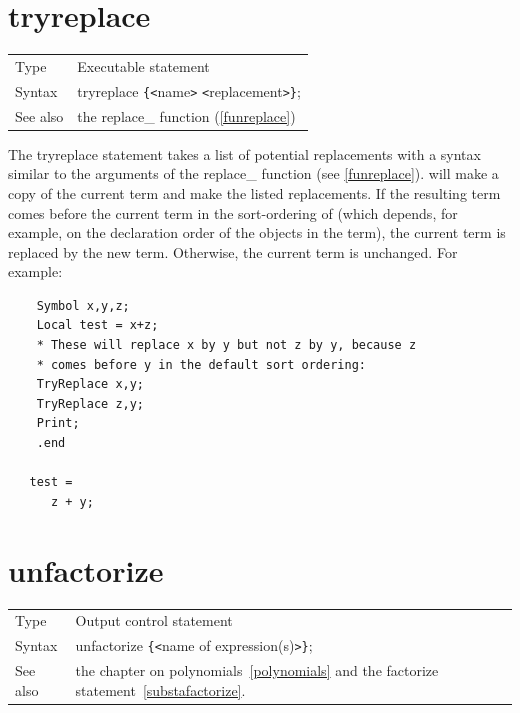 \vspace{10mm}


\section{tryreplace}
\label{substatryreplace}

\noindent \begin{tabular}{ll}
Type & Executable statement\\
Syntax & tryreplace \verb:{:{\tt<}name{\tt>} {\tt<}replacement{\tt>}\verb:}:;
\\ See also & the replace\_ function (\ref{funreplace})
\end{tabular} \vspace{4mm}

The tryreplace statement takes a list of potential
replacements with a syntax similar to the arguments of the
replace\_ function (see
\ref{funreplace}). {\FORM} will make a copy of the current term and make the
listed replacements. If the resulting term comes before the current term in
the sort-ordering of {\FORM} (which depends, for example, on the declaration
order of the objects in the term), the current term is replaced by the new
term. Otherwise, the current term is unchanged. For example:
\begin{verbatim}
    Symbol x,y,z;
    Local test = x+z;
    * These will replace x by y but not z by y, because z
    * comes before y in the default sort ordering:
    TryReplace x,y;
    TryReplace z,y;
    Print;
    .end

   test =
      z + y;
\end{verbatim}
\vspace{10mm}


\section{unfactorize}
\label{substaunfactorize}

\noindent \begin{tabular}{ll}
Type & Output control statement\\
Syntax & unfactorize \verb:{:{\tt<}name of expression(s){\tt>}\verb:}:;
\\ See also & the chapter on polynomials~\ref{polynomials} and the 
factorize statement~\ref{substafactorize}.
\end{tabular} \vspace{4mm}

